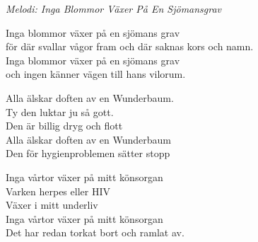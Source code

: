 {\footnotesize\textit{Melodi: Inga Blommor Växer På En Sjömansgrav}}\par
\vspace{10pt}
Inga blommor växer på en sjömans grav\\
för där svallar vågor fram och där saknas kors och namn.\\ 
Inga blommor växer på en sjömans grav \\
och ingen känner vägen till hans vilorum.\par
\vspace{10pt}
Alla älskar doften av en Wunderbaum.\\
Ty den luktar ju så gott.\\
Den är billig dryg och flott\\
Alla älskar doften av en Wunderbaum\\
Den för hygienproblemen sätter stopp\par
\vspace{10pt}
Inga vårtor växer på mitt könsorgan\\
Varken herpes eller HIV\\
Växer i mitt underliv\\
Inga vårtor växer på mitt könsorgan\\
Det har redan torkat bort och ramlat av.
